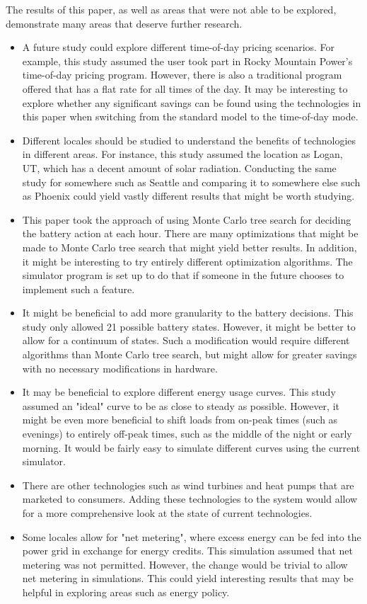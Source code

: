 The results of this paper, as well as areas that were not able to be explored, demonstrate many areas that deserve further research.

\begin{itemize}
    \item A future study could explore different time-of-day pricing scenarios. For example, this study assumed the user took part in Rocky Mountain Power's time-of-day pricing program. However, there is also a traditional program offered that has a flat rate for all times of the day. It may be interesting to explore whether any significant savings can be found using the technologies in this paper when switching from the standard model to the time-of-day mode.
    \item Different locales should be studied to understand the benefits of technologies in different areas. For instance, this study assumed the location as Logan, UT, which has a decent amount of solar radiation. Conducting the same study for somewhere such as Seattle and comparing it to somewhere else such as Phoenix could yield vastly different results that might be worth studying.
    \item This paper took the approach of using Monte Carlo tree search for deciding the battery action at each hour. There are many optimizations that might be made to Monte Carlo tree search that might yield better results. In addition, it might be interesting to try entirely different optimization algorithms. The simulator program is set up to do that if someone in the future chooses to implement such a feature.
    \item It might be beneficial to add more granularity to the battery decisions. This study only allowed 21 possible battery states. However, it might be better to allow for a continuum of states. Such a modification would require different algorithms than Monte Carlo tree search, but might allow for greater savings with no necessary modifications in hardware.
    \item It may be beneficial to explore different energy usage curves. This study assumed an "ideal" curve to be as close to steady as possible. However, it might be even more beneficial to shift loads from on-peak times (such as evenings) to entirely off-peak times, such as the middle of the night or early morning. It would be fairly easy to simulate different curves using the current simulator.
    \item There are other technologies such as wind turbines and heat pumps that are marketed to consumers. Adding these technologies to the system would allow for a more comprehensive look at the state of current technologies.
    \item Some locales allow for "net metering", where excess energy can be fed into the power grid in exchange for energy credits. This simulation assumed that net metering was not permitted. However, the change would be trivial to allow net metering in simulations. This could yield interesting results that may be helpful in exploring areas such as energy policy.
\end{itemize}